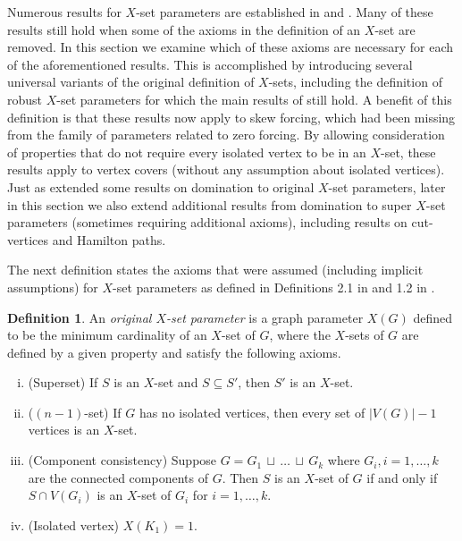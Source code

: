 \documentclass{article}
\numberwithin{figure}{section}
\numberwithin{table}{section}
\numberwithin{equation}{section}
\theoremstyle{definition}
\theoremstyle{definition}
\newtheorem{defn}[thm]{Definition}
\theoremstyle{definition}
\newcommand {\du} {\,\sqcup\,}
\newcommand{\Xo}{X}
\begin{document}
{Numerous results for $X$-set parameters are established in \cite{PDrecon} and \cite{XTARiso}.  
 Many of these results still hold when some of the axioms in the definition of an $X$-set are removed.
In this section we  examine which  of these axioms  are necessary for each  of the aforementioned  results.  This is accomplished by introducing several universal variants  of  the original definition of $X$-sets, including the definition of robust $X$-set parameters  for which the main results of \cite{PDrecon, XTARiso} still hold. A 
benefit of this definition is that these results now apply to skew forcing, which had been missing from the family of parameters related to zero forcing.  By allowing consideration of properties that do not require every isolated vertex to be in an $X$-set, these results apply to vertex covers (without any assumption  about isolated vertices).
Just as \cite{PDrecon} extended some results on domination to original $X$-set parameters, later in this section we also extend additional results from domination to super  $X$-set parameters (sometimes requiring additional axioms),  including results on cut-vertices and Hamilton paths.


The next definition states the axioms that were assumed (including  implicit assumptions) for $X$-set parameters as defined in Definitions 2.1 in \cite{PDrecon} and 1.2 in \cite{XTARiso}. 

\begin{defn}\label{def:original+assumed}
 An {\em original $X$-set parameter} is  
   a graph parameter $X(G)$ defined to be the minimum cardinality of an $X$-set of $G$, where the $X$-sets of $G$  are defined by a given property and satisfy the following  axioms. 

\begin{enumerate}[(i)]
\item(Superset) 
If $S$ is an $X$-set and $S\subseteq S'$, then $S'$ is an $X$-set.




\item\label{axo:n-1}  ($(n-1)$-set) If $G$ has no isolated vertices, then every set of $|V(G)|-1$ vertices is an $X$-set. 
\item\label{ax:component}
(Component consistency) Suppose $G = G_1\du \dots \du G_k$ where $G_i,i=1,\dots,k$ are the connected components of $G$.  Then $S$ is an $X$-set of $G$ if and only if $S\cap V(G_i)$ is an $X$-set of $G_i$ for $i=1,\dots,k$.

\item\label{ax:whole}  (Isolated vertex) $\Xo(K_1)=1$. 


\end{enumerate}
\end{defn}}
\end{document}
